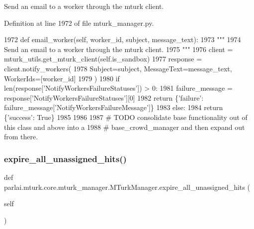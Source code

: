 \begin{DoxyVerb}Send an email to a worker through the mturk client.
\end{DoxyVerb}
 

Definition at line 1972 of file mturk\+\_\+manager.\+py.


\begin{DoxyCode}
1972     \textcolor{keyword}{def }email\_worker(self, worker\_id, subject, message\_text):
1973         \textcolor{stringliteral}{"""}
1974 \textcolor{stringliteral}{        Send an email to a worker through the mturk client.}
1975 \textcolor{stringliteral}{        """}
1976         client = mturk\_utils.get\_mturk\_client(self.is\_sandbox)
1977         response = client.notify\_workers(
1978             Subject=subject, MessageText=message\_text, WorkerIds=[worker\_id]
1979         )
1980         \textcolor{keywordflow}{if} len(response[\textcolor{stringliteral}{'NotifyWorkersFailureStatuses'}]) > 0:
1981             failure\_message = response[\textcolor{stringliteral}{'NotifyWorkersFailureStatuses'}][0]
1982             \textcolor{keywordflow}{return} \{\textcolor{stringliteral}{'failure'}: failure\_message[\textcolor{stringliteral}{'NotifyWorkersFailureMessage'}]\}
1983         \textcolor{keywordflow}{else}:
1984             \textcolor{keywordflow}{return} \{\textcolor{stringliteral}{'success'}: \textcolor{keyword}{True}\}
1985 
1986 
1987 \textcolor{comment}{# TODO consolidate base functionality out of this class and above into a}
1988 \textcolor{comment}{# base\_crowd\_manager and then expand out from there.}
\end{DoxyCode}
\mbox{\label{classparlai_1_1mturk_1_1core_1_1mturk__manager_1_1MTurkManager_a063250ea0ea08fe75ab3bb5aee637138}} 
\subsubsection{\texorpdfstring{expire\+\_\+all\+\_\+unassigned\+\_\+hits()}{expire\_all\_unassigned\_hits()}}
{\footnotesize\ttfamily def parlai.\+mturk.\+core.\+mturk\+\_\+manager.\+M\+Turk\+Manager.\+expire\+\_\+all\+\_\+unassigned\+\_\+hits (\begin{DoxyParamCaption}\item[{}]{self }\end{DoxyParamCaption})}

